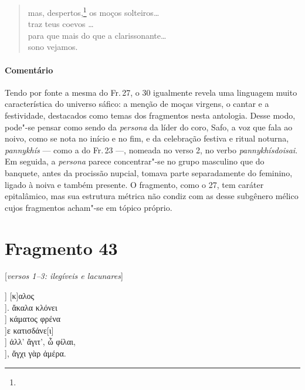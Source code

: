 {\begin{verse}
mas, despertos,\footnote{} os moços solteiros\ldots{}\\
traz teus coevos \ldots{}\\
para que mais do que a clarissonante\ldots{}\\
sono vejamos.
\end{verse}

\medskip
{\paragraph{Comentário} Tendo por fonte a mesma do Fr.\,27, o 30 igualmente revela uma linguagem muito característica do universo sáfico: a menção de moças virgens, o cantar e a festividade, destacados como temas dos fragmentos nesta antologia. Desse modo, pode"-se pensar como sendo da \emph{persona} da líder do coro, Safo, a
voz que fala ao noivo, como se nota no início e no fim, e da celebração
festiva e ritual noturna, \emph{pannykhís} --- como a do Fr.\,23 ---, nomeada no verso 2, no verbo \emph{pannykhísdoisai}. Em seguida, a \emph{persona} parece concentrar"-se no grupo masculino que do
banquete, antes da procissão nupcial, tomava parte separadamente do feminino,
ligado à noiva e também presente. O fragmento, como o 27, tem caráter
epitalâmico, mas sua estrutura métrica não condiz com as desse subgênero
mélico cujos fragmentos acham"-se em tópico próprio.}}

\section{Fragmento 43} 

\begin{gkverse}
\textnormal{[\emph{versos 1--3: ilegíveis e lacunares}]}

] [κ]αλος\\
         ]. ἄκαλα κλόνει\\
         ] κάματος φρένα\\
       ]ε κατισδάνε[ι]\\
       ] ἀλλ’ ἄγιτ’, ὦ φίλαι,\\
       ], ἄγχι γὰρ ἀμέρα.
\end{gkverse}

